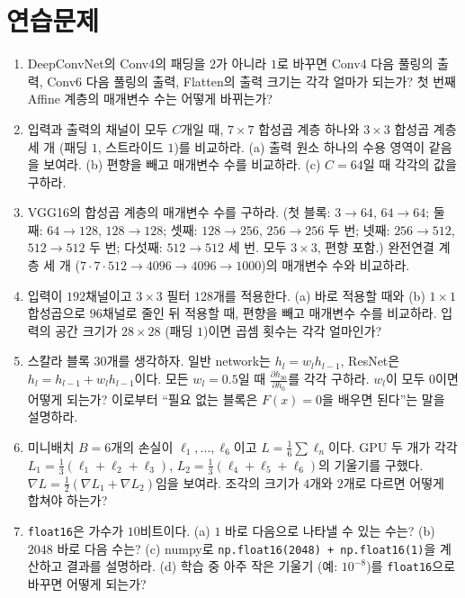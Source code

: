 \documentclass[11pt,a4paper]{article}
\newcommand{\grad}{\nabla}
\newcommand{\pd}[2]{\frac{\partial #1}{\partial #2}}
\begin{document}
\section{연습문제}

\begin{enumerate}[label=\arabic*.]

\item DeepConvNet의 Conv4의 패딩을 $2$가 아니라 $1$로 바꾸면 Conv4 다음 풀링의 출력, Conv6 다음 풀링의 출력,
Flatten의 출력 크기는 각각 얼마가 되는가? 첫 번째 Affine 계층의 매개변수 수는 어떻게 바뀌는가?

\item 입력과 출력의 채널이 모두 $C$개일 때, $7\times7$ 합성곱 계층 하나와 $3\times3$ 합성곱 계층 세 개 (패딩 $1$, 스트라이드 $1$)를 비교하라.
(a) 출력 원소 하나의 수용 영역이 같음을 보여라. (b) 편향을 빼고 매개변수 수를 비교하라. (c) $C=64$일 때 각각의 값을 구하라.

\item VGG16의 합성곱 계층의 매개변수 수를 구하라. (첫 블록: $3\to64$, $64\to64$; 둘째: $64\to128$, $128\to128$;
셋째: $128\to256$, $256\to256$ 두 번; 넷째: $256\to512$, $512\to512$ 두 번; 다섯째: $512\to512$ 세 번. 모두 $3\times3$, 편향 포함.)
완전연결 계층 세 개 ($7\cdot7\cdot512\to4096\to4096\to1000$)의 매개변수 수와 비교하라.

\item 입력이 $192$채널이고 $3\times3$ 필터 $128$개를 적용한다. (a) 바로 적용할 때와 (b) $1\times1$ 합성곱으로 $96$채널로 줄인 뒤 적용할 때,
편향을 빼고 매개변수 수를 비교하라. 입력의 공간 크기가 $28\times28$ (패딩 $1$)이면 곱셈 횟수는 각각 얼마인가?

\item 스칼라 블록 $30$개를 생각하자. 일반 network는 $h_{l}=w_l h_{l-1}$, ResNet은 $h_{l}=h_{l-1}+w_l h_{l-1}$이다.
모든 $w_l=0.5$일 때 $\pd{h_{30}}{h_0}$를 각각 구하라. $w_l$이 모두 $0$이면 어떻게 되는가?
이로부터 ``필요 없는 블록은 $F(x)=0$을 배우면 된다''는 말을 설명하라.

\item 미니배치 $B=6$개의 손실이 $\ell_1,\ldots,\ell_6$이고 $L=\frac16\sum\ell_n$이다.
GPU 두 개가 각각 $L_1=\frac13(\ell_1+\ell_2+\ell_3)$, $L_2=\frac13(\ell_4+\ell_5+\ell_6)$의 기울기를 구했다.
$\grad L=\frac12(\grad L_1+\grad L_2)$임을 보여라. 조각의 크기가 $4$개와 $2$개로 다르면 어떻게 합쳐야 하는가?

\item \texttt{float16}은 가수가 $10$비트이다. (a) $1$ 바로 다음으로 나타낼 수 있는 수는? (b) $2048$ 바로 다음 수는?
(c) numpy로 \texttt{np.float16(2048) + np.float16(1)}을 계산하고 결과를 설명하라.
(d) 학습 중 아주 작은 기울기 (예: $10^{-8}$)를 \texttt{float16}으로 바꾸면 어떻게 되는가?


\end{enumerate}
\end{document}

